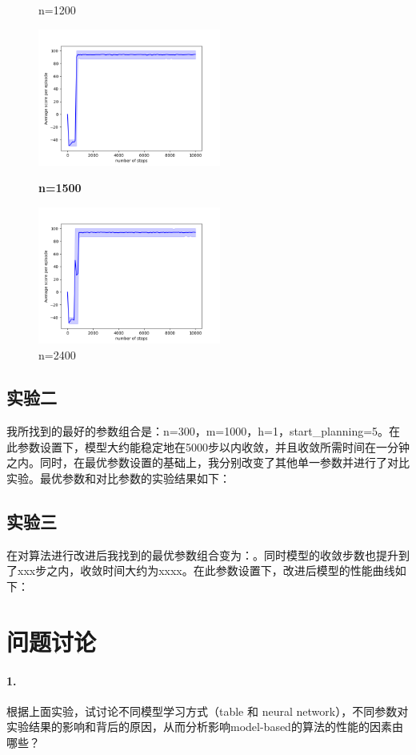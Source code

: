 \documentclass[a4paper,12pt]{article}
\begin{document}
\begin{CJK}{UTF8}{gbsn}
\begin{figure}[htbp]
\begin{minipage}[t]{0.45\textwidth}
		\caption{n=1200}
	\end{minipage}
	\begin{minipage}[t]{0.45\textwidth}
		\centering
		\includegraphics[width=6cm]{resource/n=1500/performance.png}
		\caption{\textbf{n=1500}}
	\end{minipage}
	\begin{minipage}[t]{0.45\textwidth}
	\centering
	\includegraphics[width=6cm]{resource/n=2400/performance.png}
	\caption{n=2400}
\end{minipage}
\end{figure}
\newpage
\subsection{实验二}
我所找到的最好的参数组合是：n=300，m=1000，h=1，start\_planning=5。在此参数设置下，模型大约能稳定地在5000步以内收敛，并且收敛所需时间在一分钟之内。同时，在最优参数设置的基础上，我分别改变了其他单一参数并进行了对比实验。最优参数和对比参数的实验结果如下：
\subsection{实验三}
在对算法进行改进后我找到的最优参数组合变为：。同时模型的收敛步数也提升到了xxx步之内，收敛时间大约为xxxx。在此参数设置下，改进后模型的性能曲线如下：
\section{问题讨论}
\paragraph{1.}根据上面实验，试讨论不同模型学习方式（table 和 neural network），不同参数对实验结果的影响和背后的原因，从而分析影响model-based的算法的性能的因素由哪些？



\end{CJK}
\end{document}
